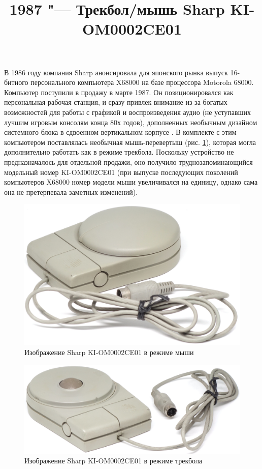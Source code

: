 \documentclass[11pt, a4paper]{article}
\begin{document}
\title{1987 "--- Трекбол/мышь Sharp KI-OM0002CE01}
\date{}
\maketitle
{}

В 1986 году компания Sharp анонсировала для японского рынка выпуск 16-битного персонального компьютера  X68000 на базе процессора Motorola 68000. Компьютер поступили в продажу в марте 1987. Он позиционировался как персональная рабочая станция, и сразу привлек внимание из-за богатых возможностей для работы с графикой и воспроизведения аудио (не уступавших лучшим игровым консолям конца 80х годов), дополненных необычным дизайном системного блока в сдвоенном вертикальном корпусе \cite{museum}. В комплекте с этим компьютером поставлялась необычная мышь-перевертыш (рис. \ref{fig:SharpConvertibleMouse}), которая могла дополнительно работать как в режиме трекбола. Поскольку устройство не предназначалось для отдельной продажи, оно получило труднозапоминающийся модельный номер KI-OM0002CE01 (при выпуске последующих поколений компьютеров X68000 номер модели мыши увеличивался на единицу, однако сама она не претерпевала заметных изменений).

\begin{figure}[h]
    \centering
    \includegraphics[scale=0.65]{1987_sharp_convertible/picmouse_60}
    \caption{Изображение Sharp KI-OM0002CE01 в режиме мыши}
    \label{fig:SharpConvertibleMouse}
\end{figure}

\begin{figure}[h]
    \centering
    \includegraphics[scale=0.65]{1987_sharp_convertible/picball_60}
    \caption{Изображение Sharp KI-OM0002CE01 в режиме трекбола}
    \label{fig:SharpConvertibleTrackball}
\end{figure}
\end{document}
